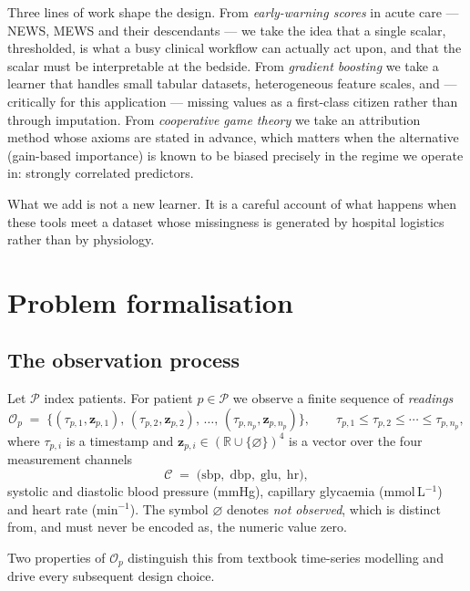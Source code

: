 \documentclass[11pt,a4paper]{article}
\newcommand{\R}{\mathbb{R}}
\newcommand{\sbp}{\mathrm{sbp}}
\newcommand{\dbp}{\mathrm{dbp}}
\newcommand{\glu}{\mathrm{glu}}
\newcommand{\hr}{\mathrm{hr}}
\begin{document}
Three lines of work shape the design. From \emph{early-warning scores} in acute
care --- NEWS, MEWS and their descendants --- we take the idea that a single scalar,
thresholded, is what a busy clinical workflow can actually act upon, and that the
scalar must be interpretable at the bedside. From \emph{gradient boosting}
\cite{friedman2001,chen2016} we take a learner that handles small tabular
datasets, heterogeneous feature scales, and --- critically for this application ---
missing values as a first-class citizen rather than through imputation. From
\emph{cooperative game theory} \cite{shapley1953,lundberg2017,lundberg2020} we take
an attribution method whose axioms are stated in advance, which matters when the
alternative (gain-based importance) is known to be biased precisely in the regime
we operate in: strongly correlated predictors.

What we add is not a new learner. It is a careful account of what happens when
these tools meet a dataset whose missingness is generated by hospital logistics
rather than by physiology.

\section{Problem formalisation}
\label{sec:formal}

\subsection{The observation process}

Let $\mathcal{P}$ index patients. For patient $p\in\mathcal{P}$ we observe a finite
sequence of \emph{readings}
\[
  \mathcal{O}_p \;=\; \bigl\{(\tau_{p,1}, \mathbf{z}_{p,1}),\,
                             (\tau_{p,2}, \mathbf{z}_{p,2}),\,\dots,\,
                             (\tau_{p,n_p}, \mathbf{z}_{p,n_p})\bigr\},
  \qquad \tau_{p,1} \le \tau_{p,2} \le \cdots \le \tau_{p,n_p},
\]
where $\tau_{p,i}$ is a timestamp and
$\mathbf{z}_{p,i}\in(\R\cup\{\varnothing\})^{4}$ is a vector over the four
measurement channels
\[
  \mathcal{C} \;=\; \bigl(\sbp,\; \dbp,\; \glu,\; \hr\bigr),
\]
systolic and diastolic blood pressure (mmHg), capillary glycaemia
(mmol\,L$^{-1}$) and heart rate (min$^{-1}$). The symbol $\varnothing$ denotes
\emph{not observed}, which is distinct from, and must never be encoded as,
the numeric value zero.

Two properties of $\mathcal{O}_p$ distinguish this from textbook time-series
modelling and drive every subsequent design choice.
\end{document}

